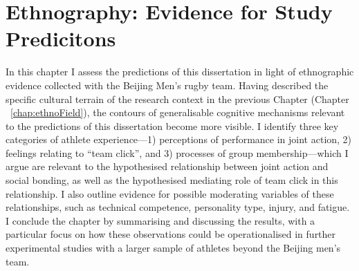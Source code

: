 \chapter{\label{chap:ethnoResults}Ethnography: Evidence for Study Predicitons}

\minitoc



In this chapter I assess the predictions of this dissertation in light of ethnographic evidence collected with the Beijing Men's rugby team.  Having described the specific cultural terrain of the research context in the previous Chapter (Chapter ~\ref{chap:ethnoField}), the contours of generalisable cognitive mechanisms relevant to the predictions of this dissertation become more visible. I identify three key categories of athlete experience---1) perceptions of performance in joint action, 2) feelings relating to ``team click'', and 3) processes of group membership---which I argue are relevant to the hypothesised relationship between joint action and social bonding, as well as the hypothesised mediating role of team click in this relationship. I also outline evidence for possible moderating variables of these relationships, such as technical competence, personality type, injury, and fatigue. I conclude the chapter by summarising and discussing the results, with a particular focus on how these observations could be operationalised in further experimental studies with a larger sample of athletes beyond the Beijing men's team.






